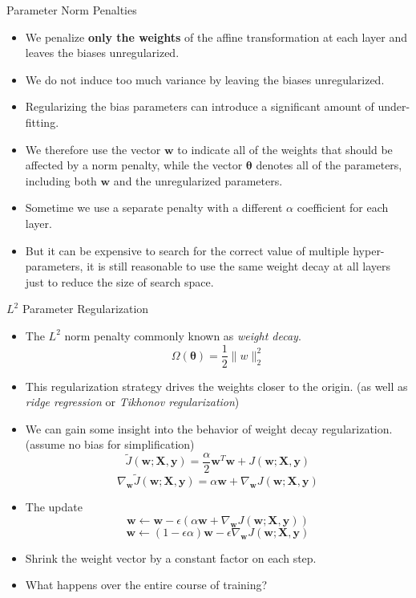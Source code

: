 \documentclass[10pt]{beamer}
\begin{document}
	\begin{frame}{Parameter Norm Penalties}
		\begin{itemize}
			\item We penalize \textbf{only the weights} of the affine transformation at each layer and leaves the biases unregularized.
			\pause
			\item We do not induce too much variance by leaving the biases unregularized.
			\pause
			\item Regularizing the bias parameters can introduce a significant amount of under-fitting.
			\pause
			\item We therefore use the vector $\bm{w}$ to indicate all of the weights that should be affected by a norm penalty, while the vector $\bm{\theta}$ denotes all of the parameters, including both $\bm{w}$ and the unregularized parameters.
			\pause
			\item Sometime we use a separate penalty with a different $\alpha$ coefficient for each layer.
			\pause
			\item But it can be expensive to search for the correct value of multiple hyper-parameters, it is still reasonable to use the same weight decay at all layers just to reduce the size of search space.
		\end{itemize}
	\end{frame}
	
	\begin{frame}{$L^2$ Parameter Regularization}
		\begin{itemize}
			\pause
			\item The $L^2$ norm penalty commonly known as \emph{weight decay}.
			\pause
			$$\Omega(\bm{\theta})=\frac{1}{2}\lVert w\rVert^2_2$$
			
			\pause
			\item This regularization strategy drives the weights closer to the origin. (as well as \emph{ridge regression} or \emph{Tikhonov regularization})
			\pause
			\item We can gain some insight into the behavior of weight decay regularization. (assume no bias for simplification)
			$$\tilde{J}(\bm{w};\bm{X},\bm{y})=\frac{\alpha}{2}\bm{w}^T\bm{w}+J(\bm{w};\bm{X},\bm{y})$$
			$$\nabla_{\bm{w}}\tilde{J}(\bm{w};\bm{X},\bm{y})=\alpha\bm{w}+\nabla_{\bm{w}}J(\bm{w};\bm{X},\bm{y})$$
			
			\pause
			\item The update
			$$\bm{w}\leftarrow\bm{w}-\epsilon(\alpha\bm{w}+\nabla_{\bm{w}}J(\bm{w};\bm{X},\bm{y}))$$
			$$\bm{w}\leftarrow(1-\epsilon\alpha)\bm{w}-\epsilon\nabla_{\bm{w}}J(\bm{w};\bm{X},\bm{y})$$

			\pause
			\item Shrink the weight vector by a constant factor on each step.
			\pause
			\item What happens over the entire course of training?
		\end{itemize}
	\end{frame}
	
\end{document}
